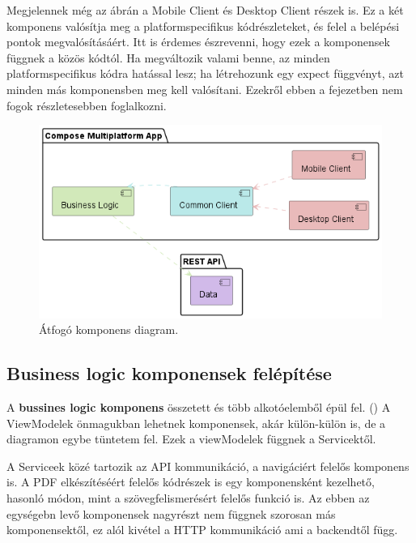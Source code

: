 Megjelennek még az ábrán a Mobile Client és Desktop Client részek is.  
Ez a két komponens valósítja meg a platformspecifikus kódrészleteket, és felel a belépési pontok megvalósításáért.  
Itt is érdemes észrevenni, hogy ezek a komponensek függnek a közös kódtól.  
Ha megváltozik valami benne, az minden platformspecifikus kódra hatással lesz; ha létrehozunk egy expect függvényt, azt minden más komponensben meg kell valósítani.  
Ezekről ebben a fejezetben nem fogok részletesebben foglalkozni.  


\begin{figure}[!ht]
    \centering
    \includegraphics[width=150mm, keepaspectratio]{figures/Component.png}
    \caption{Átfogó komponens diagram.}
    \label{fig:ComponentDiagram}
\end{figure}

\subsection{Business logic komponensek felépítése}

A \textbf{bussines logic komponens} összetett és több alkotóelemből épül fel. ()
A ViewModelek önmagukban lehetnek komponensek, akár külön-külön is, de a diagramon egybe tüntetem fel.
Ezek a viewModelek függnek a Servicektől. 

A Serviceek közé tartozik az API kommunikáció, a navigáciért felelős komponens is.
A PDF elkészítéséért felelős kódrészek is egy komponensként kezelhető, hasonló módon, mint a szövegfelismerésért felelős funkció is.
Az ebben az egységebn levő komponensek nagyrészt nem függnek szorosan más komponensektől, ez alól kivétel a HTTP kommunikáció ami a backendtől függ.


